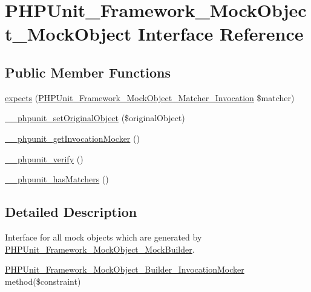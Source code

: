 \hypertarget{interface_p_h_p_unit___framework___mock_object___mock_object}{}\section{P\+H\+P\+Unit\+\_\+\+Framework\+\_\+\+Mock\+Object\+\_\+\+Mock\+Object Interface Reference}
\label{interface_p_h_p_unit___framework___mock_object___mock_object}
\subsection*{Public Member Functions}
\begin{DoxyCompactItemize}
\item 
\mbox{\hyperlink{interface_p_h_p_unit___framework___mock_object___mock_object_a1776bc980be5adac247b2a4ab1152128}{expects}} (\mbox{\hyperlink{interface_p_h_p_unit___framework___mock_object___matcher___invocation}{P\+H\+P\+Unit\+\_\+\+Framework\+\_\+\+Mock\+Object\+\_\+\+Matcher\+\_\+\+Invocation}} \$matcher)
\item 
\mbox{\hyperlink{interface_p_h_p_unit___framework___mock_object___mock_object_aa4d0cc04ee56a89094ff907a0102202d}{\+\_\+\+\_\+phpunit\+\_\+set\+Original\+Object}} (\$original\+Object)
\item 
\mbox{\hyperlink{interface_p_h_p_unit___framework___mock_object___mock_object_ad4261b61ee7c620e51c652a9d1010a3d}{\+\_\+\+\_\+phpunit\+\_\+get\+Invocation\+Mocker}} ()
\item 
\mbox{\hyperlink{interface_p_h_p_unit___framework___mock_object___mock_object_a19a4bc4031f2c613510d768d132bb9ba}{\+\_\+\+\_\+phpunit\+\_\+verify}} ()
\item 
\mbox{\hyperlink{interface_p_h_p_unit___framework___mock_object___mock_object_a99b92781783b2b1a06ded1e667fec951}{\+\_\+\+\_\+phpunit\+\_\+has\+Matchers}} ()
\end{DoxyCompactItemize}


\subsection{Detailed Description}
Interface for all mock objects which are generated by \mbox{\hyperlink{class_p_h_p_unit___framework___mock_object___mock_builder}{P\+H\+P\+Unit\+\_\+\+Framework\+\_\+\+Mock\+Object\+\_\+\+Mock\+Builder}}.

\mbox{\hyperlink{class_p_h_p_unit___framework___mock_object___builder___invocation_mocker}{P\+H\+P\+Unit\+\_\+\+Framework\+\_\+\+Mock\+Object\+\_\+\+Builder\+\_\+\+Invocation\+Mocker}} method(\$constraint)

